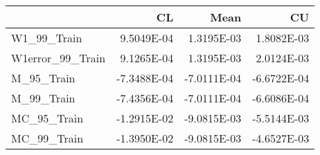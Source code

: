 \begin{tabular}{lrrr}
\toprule
{} &          CL &        Mean &          CU \\
\midrule
W1\_99\_Train      &  9.5049E-04 &  1.3195E-03 &  1.8082E-03 \\
W1error\_99\_Train &  9.1265E-04 &  1.3195E-03 &  2.0124E-03 \\
M\_95\_Train       & -7.3488E-04 & -7.0111E-04 & -6.6722E-04 \\
M\_99\_Train       & -7.4356E-04 & -7.0111E-04 & -6.6086E-04 \\
MC\_95\_Train      & -1.2915E-02 & -9.0815E-03 & -5.5144E-03 \\
MC\_99\_Train      & -1.3950E-02 & -9.0815E-03 & -4.6527E-03 \\
\bottomrule
\end{tabular}
